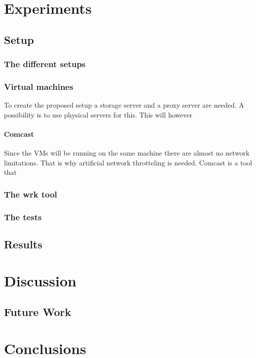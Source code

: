 \documentclass[twoside,openright]{uva-bachelor-thesis}
\begin{document}
\chapter{Experiments}
\section{Setup}
\subsection{The different setups}

\subsection{Virtual machines}
To create the proposed setup a storage server and a proxy server are needed. A
possibility is to use physical servers for this. This will however


\subsubsection{Comcast}
Since the VMs will be running on the same machine there are almost no network
limitations. That is why artificial network throtteling is needed. Comcast is a
tool that

\subsection{The wrk tool}
\subsection{The tests}

\section{Results}

\chapter{Discussion}
\section{Future Work}
\chapter{Conclusions}


\printbibliography[heading=bibintoc]{}

\printglossaries{}
\end{document}
